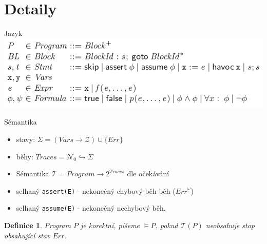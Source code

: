 \documentclass[11pt]{beamer}
\newtheorem{dfn}{Definice}
\begin{document}
\section{Detaily}

\begin{frame}{Jazyk}
\includegraphics[width=0.9\linewidth]{img/boogieSubset.png}
\end{frame}


\begin{frame}{Sémantika}
\begin{itemize}
\pause \item stavy: $\Sigma = \left(\textit{Vars} \rightarrow \mathcal{Z} \right) \cup \{ \textit{Err} \} $
\pause \item běhy: $\textit{Traces} = \mathcal{N}_0 \hookrightarrow \Sigma$
\pause \item Sémantika $\mathcal{T} = \textit{Program} \rightarrow 2^{\textit{Traces}}$ dle očekávání
\pause \item selhaný \lstinline|assert(E)| - nekonečný chybový běh běh ($\textit{Err}^\omega$)
\pause \item selhaný \lstinline|assume(E)| - nekonečný nechybový běh.
\end{itemize}

\pause 

\begin{dfn}
Program $P$ je korektní, píšeme $\vDash P$, pokud $\mathcal{T}(P)$ neobsahuje stop obsahující stav $\textit{Err}$.
\end{dfn}
\end{frame}
\end{document}
